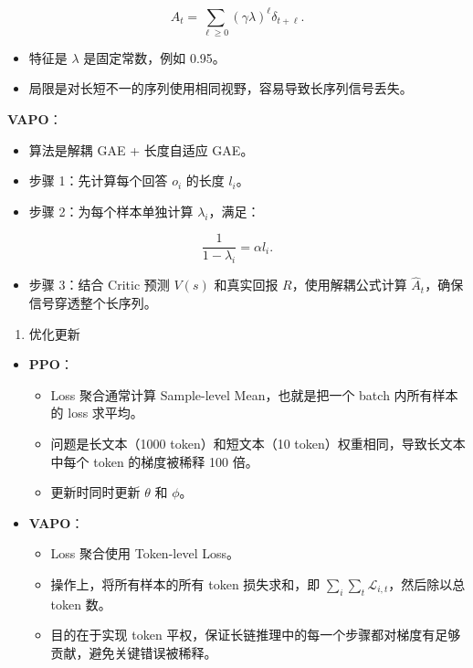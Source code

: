\[
A_t
=
\sum_{\ell\ge 0}(\gamma\lambda)^\ell\delta_{t+\ell}.
\]

\begin{itemize}
\tightlist
\item
  特征是 \(\lambda\) 是固定常数，例如 0.95。
\item
  局限是对长短不一的序列使用相同视野，容易导致长序列信号丢失。
\end{itemize}

\textbf{VAPO}：

\begin{itemize}
\tightlist
\item
  算法是解耦 GAE + 长度自适应 GAE。
\item
  步骤 1：先计算每个回答 \(o_i\) 的长度 \(l_i\)。
\item
{}
  步骤 2：为每个样本单独计算 \(\lambda_i\)，满足：
\end{itemize}

\[
\frac{1}{1-\lambda_i}
=
\alpha l_i.
\]

\begin{itemize}
\tightlist
\item
  步骤 3：结合 Critic 预测 \(V(s)\) 和真实回报 \(R\)，使用解耦公式计算 \(\hat{A}_t\)，确保信号穿透整个长序列。
\end{itemize}

\begin{enumerate}
\def\labelenumi{\arabic{enumi}.}
\setcounter{enumi}{3}
\tightlist
\item
  优化更新
\end{enumerate}

\begin{itemize}
\tightlist
\item
{}
  \textbf{PPO}：

  \begin{itemize}
  \tightlist
  \item
    Loss 聚合通常计算 Sample-level Mean，也就是把一个 batch 内所有样本的 loss 求平均。
  \item
    问题是长文本（1000 token）和短文本（10 token）权重相同，导致长文本中每个 token 的梯度被稀释 100 倍。
  \item
    更新时同时更新 \(\theta\) 和 \(\phi\)。
  \end{itemize}
\item
{}
  \textbf{VAPO}：

  \begin{itemize}
  \tightlist
  \item
    Loss 聚合使用 Token-level Loss。
  \item
    操作上，将所有样本的所有 token 损失求和，即 \(\sum_i\sum_t \mathcal{L}_{i,t}\)，然后除以总 token 数。
  \item
    目的在于实现 token 平权，保证长链推理中的每一个步骤都对梯度有足够贡献，避免关键错误被稀释。
  \end{itemize}
\end{itemize}


